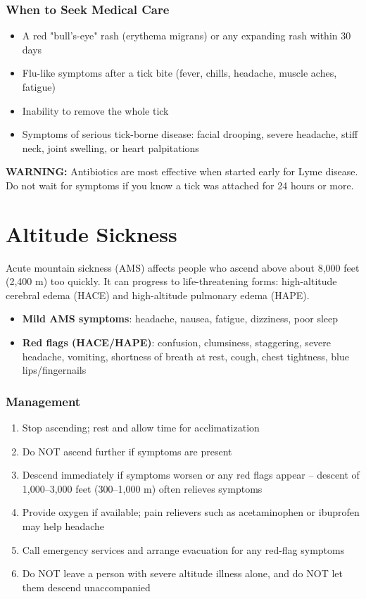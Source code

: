 \subsubsection{When to Seek Medical Care}

\begin{itemize}[leftmargin=*]
\item A red "bull's-eye" rash (erythema migrans) or any expanding rash within 30 days
\item Flu-like symptoms after a tick bite (fever, chills, headache, muscle aches, fatigue)
\item Inability to remove the whole tick
\item Symptoms of serious tick-borne disease: facial drooping, severe headache, stiff neck, joint swelling, or heart palpitations
\end{itemize}

\textbf{WARNING:} Antibiotics are most effective when started early for Lyme disease. Do not wait for symptoms if you know a tick was attached for 24 hours or more.

\section{Altitude Sickness}

Acute mountain sickness (AMS) affects people who ascend above about 8,000 feet (2,400 m) too quickly. It can progress to life-threatening forms: high-altitude cerebral edema (HACE) and high-altitude pulmonary edema (HAPE).

\begin{itemize}[leftmargin=*]
\item \textbf{Mild AMS symptoms}: headache, nausea, fatigue, dizziness, poor sleep
\item \textbf{Red flags (HACE/HAPE)}: confusion, clumsiness, staggering, severe headache, vomiting, shortness of breath at rest, cough, chest tightness, blue lips/fingernails
\end{itemize}

\subsubsection{Management}

\begin{enumerate}[leftmargin=*]
\item Stop ascending; rest and allow time for acclimatization
\item Do NOT ascend further if symptoms are present
\item Descend immediately if symptoms worsen or any red flags appear -- descent of 1,000--3,000 feet (300--1,000 m) often relieves symptoms
\item Provide oxygen if available; pain relievers such as acetaminophen or ibuprofen may help headache
\item Call emergency services and arrange evacuation for any red-flag symptoms
\item Do NOT leave a person with severe altitude illness alone, and do NOT let them descend unaccompanied
\end{enumerate}
